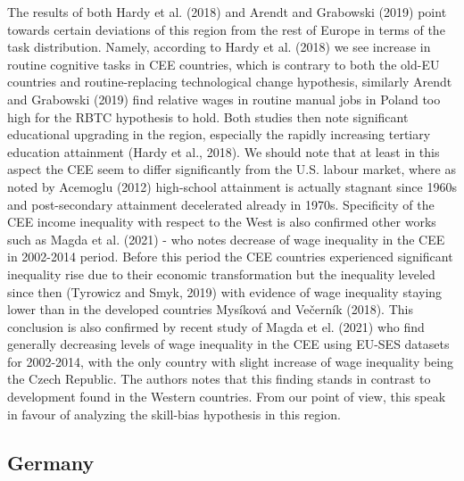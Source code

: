 \documentclass{article}
\begin{document}
The results of both Hardy et al. (2018) and Arendt and Grabowski (2019)  point towards certain deviations of this region from the rest of Europe in terms of the task distribution. Namely, according to Hardy et al. (2018) we see increase in routine cognitive tasks in CEE countries, which is contrary to both the old-EU countries and routine-replacing technological change hypothesis, similarly Arendt and Grabowski (2019) find relative wages in routine manual jobs in Poland too high for the RBTC hypothesis to hold. Both studies then note significant educational upgrading in the region, especially the rapidly increasing tertiary education attainment (Hardy et al., 2018). We should note that at least in this aspect the CEE seem to differ significantly from the U.S. labour market, where as noted by Acemoglu (2012) high-school attainment is actually stagnant since 1960s and post-secondary attainment decelerated already in 1970s. Specificity of the CEE income inequality with respect to the West is also confirmed other works such as Magda et al. (2021) - who notes decrease of wage inequality in the CEE in 2002-2014 period. Before this period the CEE countries experienced significant inequality rise due to their economic transformation but the inequality leveled since then (Tyrowicz and Smyk, 2019) with evidence of wage inequality staying lower than in the developed countries Mysíková and Večerník (2018). This conclusion is also confirmed by recent study of Magda et el. (2021) who find generally decreasing levels of wage inequality in the CEE using EU-SES datasets for 2002-2014, with the only country with slight increase of wage inequality being the Czech Republic. The authors notes that this finding stands in contrast to development found in the Western countries. From our point of view, this speak in favour of analyzing the skill-bias hypothesis in this region.



\subsection{Germany}

\end{document}
